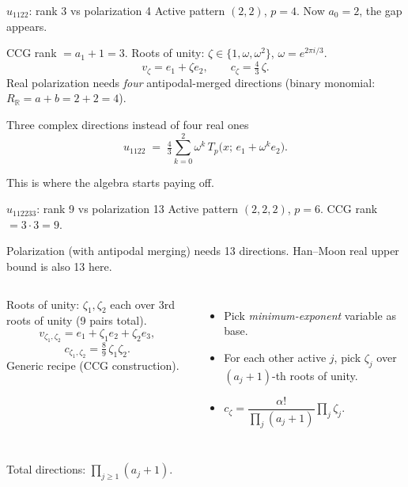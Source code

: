 \documentclass[10pt,aspectratio=169]{beamer}
\newcommand{\R}{\mathbb{R}}
\newcommand{\Tp}{T_p}
\begin{document}
\begin{frame}{$u_{1122}$: \alert{rank 3} vs polarization 4}
  Active pattern $(2,2)$, $p=4$. \alert{Now $a_0=2$, the gap appears.}

  \medskip
  CCG rank $= a_1+1 = 3$. Roots of unity:
  $\zeta\in\{1,\omega,\omega^2\}$, $\omega = e^{2\pi i/3}$.
  \[
    v_\zeta = e_1+\zeta e_2,\qquad
    c_\zeta = \tfrac{4}{3}\,\zeta.
  \]
  \pause
  \medskip
  Real polarization needs \emph{four} antipodal-merged directions
  (binary monomial: $R_\R=a+b=2+2=4$).

  \medskip
  \begin{block}{Three complex directions instead of four real ones}
    \[
      u_{1122} \;=\;
      \tfrac{4}{3}\!\!\sum_{k=0}^{2}\omega^k\,\Tp\!\big(x;\,e_1+\omega^k e_2\big).
    \]
  \end{block}

  \medskip
  This is where the algebra starts paying off.
\end{frame}

\begin{frame}{$u_{112233}$: \alert{rank 9} vs polarization 13}
  Active pattern $(2,2,2)$, $p=6$. CCG rank $= 3\cdot3 = 9$.

  \medskip
  Polarization (with antipodal merging) needs 13 directions.
  Han--Moon real upper bound is also 13 here.

  \medskip
  \begin{columns}[T,onlytextwidth]
    Roots of unity: $\zeta_1,\zeta_2$ each over 3rd roots of unity
    (9 pairs total).
    \[
      v_{\zeta_1,\zeta_2} = e_1+\zeta_1 e_2+\zeta_2 e_3,
    \]
    \[
      c_{\zeta_1,\zeta_2} = \tfrac{8}{9}\,\zeta_1\zeta_2.
    \]
    \alert{Generic recipe (CCG construction).}
    \begin{itemize}
      \item Pick \emph{minimum-exponent} variable as base.
      \item For each other active $j$, pick $\zeta_j$ over $(a_j+1)$-th roots of unity.
      \item $c_\zeta = \dfrac{\alpha!}{\prod_j (a_j+1)}\prod_j \zeta_j$.
    \end{itemize}
  \end{columns}

  \medskip
  Total directions: $\prod_{j\ge 1}(a_j+1)$.
\end{frame}
\end{document}
